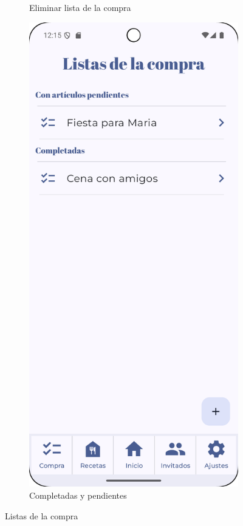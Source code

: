 \begin{figure}[H]
\begin{subfigure}[b]{0.3\textwidth}
      \caption{Eliminar lista de la compra}
      \label{fig:delete-shopping}
    \end{subfigure}
    \hfill
    \begin{subfigure}[b]{0.3\textwidth}
      \includegraphics[width=\textwidth]{./img/manual/shopping_lists_with_all_items_bought_or_not.png}
      \caption{Completadas y pendientes}
      \label{fig:complete-or-not-shopping}
    \end{subfigure}

    \caption{Listas de la compra}
    \label{fig:shopping-lists}
\end{figure}

